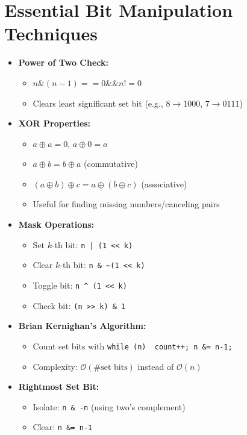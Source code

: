 \documentclass[a4paper,10pt]{book}
\begin{document}
\chapter{Essential Bit Manipulation Techniques  }
\label{sec:bits}
\begin{itemize}
    \item \textbf{Power of Two Check:}
    \begin{itemize}
        \item ${n \& (n-1) == 0 \&\& n != 0}$
        \item Clears least significant set bit (e.g., $8 \rightarrow 1000$, $7 \rightarrow 0111$)
    \end{itemize}
    
    \item \textbf{XOR Properties:}
    \begin{itemize}
        \item $a \oplus a = 0$, $a \oplus 0 = a$
        \item $a \oplus b = b \oplus a$ (commutative)
        \item $(a \oplus b) \oplus c = a \oplus (b \oplus c)$ (associative)
        \item Useful for finding missing numbers/canceling pairs
    \end{itemize}
    
    \item \textbf{Mask Operations:}
    \begin{itemize}
        \item Set $k$-th bit: \texttt{n | (1 << k)}
        \item Clear $k$-th bit: \texttt{n \& \textasciitilde(1 << k)}
        \item Toggle bit: \texttt{n \^{} (1 << k)}
        \item Check bit: \texttt{(n >> k) \& 1}
    \end{itemize}
    
    \item \textbf{Brian Kernighan's Algorithm:}
    \begin{itemize}
        \item Count set bits with \texttt{while (n) { count++; n \&= n-1; }}
        \item Complexity: $\mathcal{O}(\text{\# set bits})$ instead of $\mathcal{O}(n)$
    \end{itemize}
    
    \item \textbf{Rightmost Set Bit:}
    \begin{itemize}
        \item Isolate: \texttt{n \& -n} (using two's complement)
        \item Clear: \texttt{n \&= n-1}
    \end{itemize}
    

\end{itemize}
\end{document}
